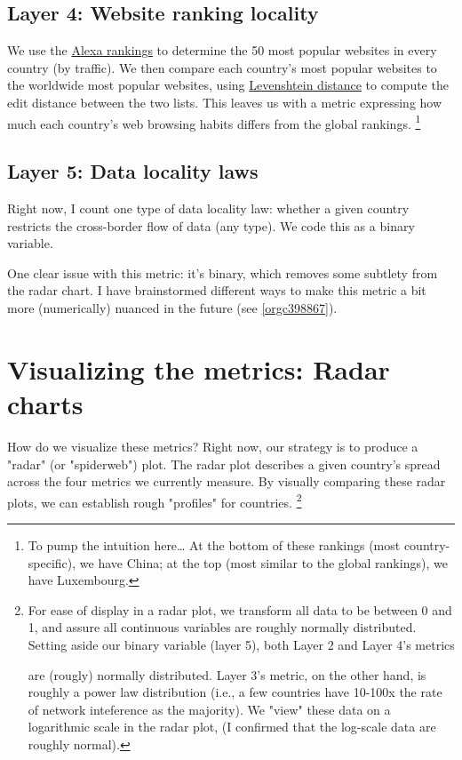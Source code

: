 \documentclass[11pt]{article}
\begin{document}
\subsection{Layer 4: Website ranking locality}
\label{sec:org7776fba}

We use the \href{https://www.alexa.com/topsites}{Alexa rankings} to determine the 50 most popular websites in every
country (by traffic). We then compare each country's most popular websites to
the worldwide most popular websites, using \href{https://en.wikipedia.org/wiki/Levenshtein\_distance}{Levenshtein distance} to compute the
edit distance between the two lists. This leaves us with a metric expressing how
much each country's web browsing habits differs from the global rankings. \footnote{To pump the intuition here\ldots{} At the bottom of these rankings (most
country-specific), we have China; at the top (most similar to the global
rankings), we have Luxembourg.} 


\subsection{Layer 5: Data locality laws}
\label{sec:orgdb81ead}

Right now, I count one type of data locality law: whether a given country
restricts the cross-border flow of data (any type). We code this as a binary
variable. 

One clear issue with this metric: it's binary, which removes some subtlety from
the radar chart. I have brainstormed different ways to make this metric a bit
more (numerically) nuanced in the future (see \ref{orgc398867}).

\section{Visualizing the metrics: Radar charts}
\label{sec:org43469fa}

How do we visualize these metrics? Right now, our strategy is to produce a
"radar" (or "spiderweb") plot. The radar plot describes a given country's spread
across the four metrics we currently measure. By visually comparing these radar
plots, we can establish rough "profiles" for countries. \footnote{For ease of display in a radar plot, we transform all data to be between
0 and 1, and assure all continuous variables are roughly normally distributed.
Setting aside our binary variable (layer 5), both Layer 2 and Layer 4's metrics

are (rougly) normally distributed. Layer 3's metric, on the other hand, is
roughly a power law distribution (i.e., a few countries have 10-100x the rate of
network inteference as the majority). We "view" these data on a logarithmic
scale in the radar plot, (I confirmed that the log-scale data are roughly
normal).}
\end{document}
